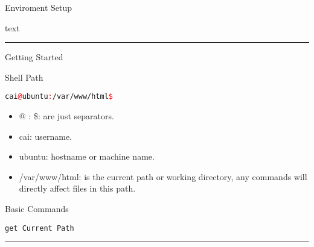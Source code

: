 \documentclass[a4paper]{article}
\begin{document}
\setlength{\parindent}{1em}
\pagestyle{fancy}
\fancyhead{}
\renewcommand{\footrulewidth}{0.5pt}
\begin{section}{Enviroment Setup}
    \par text
\end{section}
\par\noindent\rule{\linewidth}{0.5pt}
\begin{section}{Getting Started}
    \begin{subsection}{Shell Path}
        \par 
            \texttt{cai\textcolor{red}{@}ubuntu\textcolor{red}{:}/var/www/html\textcolor{red}{\$}}
        \par
            \begin{itemize}
                \setlength\itemsep{0pt}
                \item @ : \$: are just separators.
                \item cai: username.
                \item ubuntu: hostname or machine name.
                \item /var/www/html: is the current path or working directory, any commands will directly affect files in this path.
            \end{itemize}
    \end{subsection}
    \begin{subsection}{Basic Commands}
        \par \texttt{get Current Path}
    \end{subsection}
\end{section}
\par\noindent\rule{\linewidth}{0.5pt}
\end{document}
